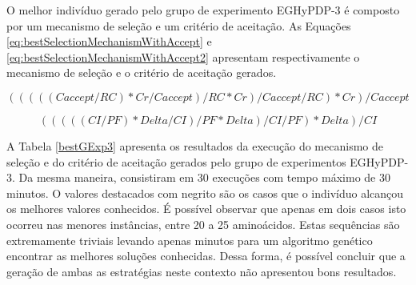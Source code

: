 	O melhor indivíduo gerado pelo grupo de experimento EGHyPDP-3 é composto por um mecanismo de seleção e um critério de aceitação. As Equações \ref{eq:bestSelectionMechanismWithAccept} e \ref{eq:bestSelectionMechanismWithAccept2} apresentam respectivamente o mecanismo de seleção e o critério de aceitação gerados.
	
	
	\begin{equation}
	\label{eq:bestSelectionMechanismWithAccept}
	( ( ( ( ( Caccept / RC ) * Cr / Caccept ) / RC * Cr ) / Caccept / RC ) * Cr ) / Caccept 
	\end{equation}
	
	
	\begin{equation}
	\label{eq:bestSelectionMechanismWithAccept2}
( ( ( ( ( CI / PF ) * Delta / CI ) / PF * Delta ) / CI / PF ) * Delta ) / CI
	\end{equation}
	
	
	A Tabela \ref{bestGExp3} apresenta os resultados da execução do mecanismo de seleção e do critério de aceitação gerados pelo grupo de experimentos EGHyPDP-3. Da mesma maneira, consistiram em 30 execuções com tempo máximo de 30 minutos. O valores destacados com negrito são os casos que o indivíduo alcançou os melhores valores conhecidos. É possível observar que apenas em dois casos isto ocorreu nas menores instâncias, entre 20 a 25 aminoácidos. Estas sequências são extremamente triviais levando apenas minutos para um  algoritmo genético encontrar as melhores soluções conhecidas. Dessa forma, é possível concluir que a geração de ambas as estratégias neste contexto não apresentou bons resultados. 
	
	\begin{table}[]
		\centering
		\caption{Resultados da execução do melhor indivíduo encontrado no grupo de experimento EGHyPDP-3}
		\label{bestGExp3}
	\end{table}
	
